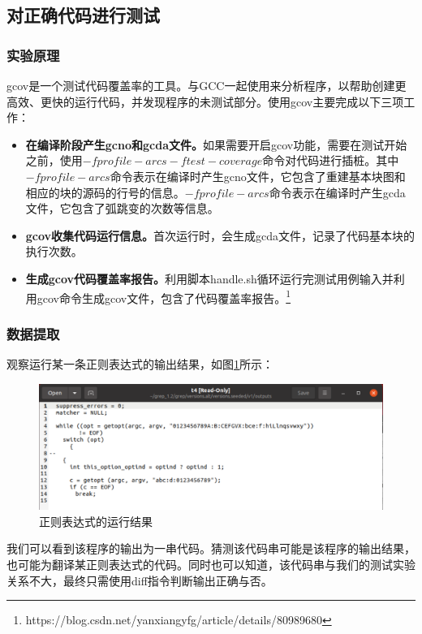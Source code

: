 \documentclass[12pt, a4paper, oneside,bibend=bibtex]{ctexart}
\begin{document}
\subsection{对正确代码进行测试}
\subsubsection{实验原理}
gcov是一个测试代码覆盖率的工具。与GCC一起使用来分析程序，以帮助创建更高效、更快的运行代码，并发现程序的未测试部分。使用gcov主要完成以下三项工作：
\begin{itemize}
    \item\textbf{在编译阶段产生gcno和gcda文件。}如果需要开启gcov功能，需要在测试开始之前，使用$-fprofile-arcs -ftest-coverage$命令对代码进行插桩。其中$-fprofile-arcs$命令表示在编译时产生gcno文件，它包含了重建基本块图和相应的块的源码的行号的信息。$-fprofile-arcs$命令表示在编译时产生gcda文件，它包含了弧跳变的次数等信息。
    \item\textbf{gcov收集代码运行信息。}首次运行时，会生成gcda文件，记录了代码基本块的执行次数。
    \item\textbf{生成gcov代码覆盖率报告。}利用脚本handle.sh循环运行完测试用例输入并利用gcov命令生成gcov文件，包含了代码覆盖率报告。\footnote{https://blog.csdn.net/yanxiangyfg/article/details/80989680}
\end{itemize}


\subsubsection{数据提取}
观察运行某一条正则表达式的输出结果，如图\ref{grepOutput}所示：

\begin{figure}[htbp]
    \centering
    \includegraphics[width=14cm]{images/grepOutput.png}
    \caption{正则表达式的运行结果}
    \label{grepOutput}
\end{figure}

我们可以看到该程序的输出为一串代码。猜测该代码串可能是该程序的输出结果，也可能为翻译某正则表达式的代码。同时也可以知道，该代码串与我们的测试实验关系不大，最终只需使用diff指令判断输出正确与否。
\end{document}

